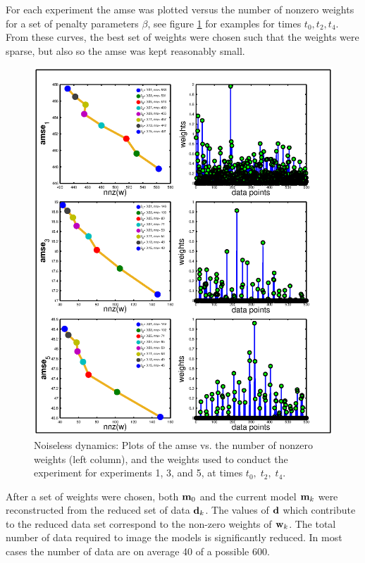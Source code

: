\documentclass[final,leqno,onefignum,onetabnum]{siamltexmm}
\begin{document}
For each experiment the amse was plotted versus the number of nonzero weights for a set of penalty parameters $\beta$, see figure \ref{fig:weights1} for examples for times $t_0,t_2,t_4$. From these curves, the best set of weights were chosen such that the weights were sparse, but also so the amse was kept reasonably small. 
\begin{figure}
	\renewcommand{\arraystretch}{1.5}
	\begin{center}
		\iwidth=135mm
		\includegraphics[width=1\iwidth]{figures/riskFig/riskFigure.eps}
	\end{center}
	\caption{Noiseless dynamics: Plots of the amse  vs. the number of nonzero weights (left column), and the weights used to conduct the experiment for experiments 1, 3, and 5, at times $t_0,\; t_2,\; t_4$.}
	\label{fig:weights1}
\end{figure}
After a set of weights were chosen, both ${\bf{m}}_0$ and the current model ${\bf{m}}_k$ were reconstructed from the reduced set of data ${\bf{d}}_k$. The values of ${\bf{d}}$ which contribute to the reduced data set correspond to the non-zero weights of ${\bf{w}}_k$. The total number of data required to image the models is significantly reduced. In most cases the number of data are on average  40 of a possible 600.
\end{document}
